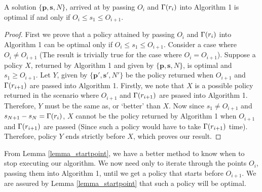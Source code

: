 \begin{lemma}
A solution $\{\bm{p},\bm{s},N\}$, arrived at by passing $O_i$ and $\Gamma(r_i)$ into Algorithm 1 is optimal if and only if $O_i\leq s_1\leq O_{i+1}$.
\label{lemma_startpoint}
\end{lemma}
\begin{proof}
First we prove that a policy attained by passing $O_i$ and $\Gamma(r_i)$ into Algorithm 1 can be optimal only if $O_i\leq s_1\leq O_{i+1}$. Consider a case where $O_i \neq O_{i+1}$ (The result is trivially true for the case where $O_i = O_{i+1}$). Suppose a policy $X$, returned by Algorithm 1 and given by $\{\bm{p},\bm{s},N\}$, is optimal and $s_1 \ge O_{i+1}$. Let $Y$, given by $\{\bm{p'},\bm{s'},N'\}$ be the policy returned when $O_{i+1}$ and $\Gamma(r_{i+1})$ are passed into Algorithm 1. Firstly, we note that $X$ is a possible policy returned in the scenario where $O_{i+1}$ and $\Gamma(r_{i+1})$ are psased into Algorithm 1. Therefore, $Y$ must be the same as, or `better' than $X$. Now since $s_1 \neq O_{i+1}$ and $s_{N+1} - s_{N} = \Gamma(r_i)$, $X$ cannot be the policy returned by Algorithm 1 when $O_{i+1}$ and $\Gamma(r_{i+1})$ are passed (Since such a policy would have to take $\Gamma(r_{i+1})$ time). Therefore, policy $Y$ ends strictly before $X$, which proves our result. 
\end{proof}
From Lemma \ref{lemma_startpoint}, we have a better method to know when to stop executing our algorithm. We now need only to iterate through the points $O_i$, passing them into Algorithm 1, until we get a policy that starts before $O_{i+1}$. We are assured by Lemma \ref{lemma_startpoint} that such a policy will be optimal.
